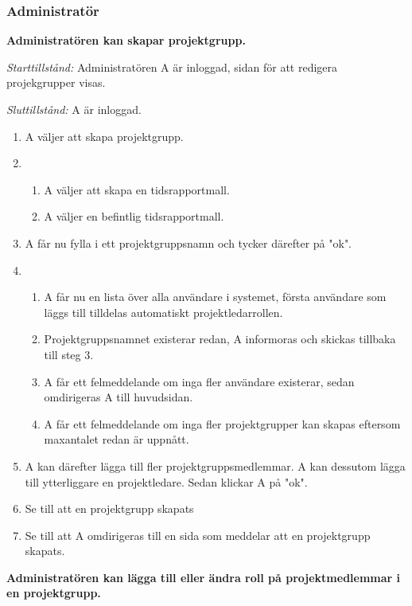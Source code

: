 \documentclass[a4paper]{article}
\begin{document}
\subsubsection{Administratör}

\begin{ST}

\item
\textbf{Administratören kan skapar projektgrupp.}

\emph{Starttillstånd:} Administratören A är inloggad, sidan för att redigera projekgrupper visas.

\emph{Sluttillstånd:} A är inloggad.

\begin{enumerate}
\item A väljer att skapa projektgrupp.
\item
\begin{enumerate}
\item A väljer att skapa en tidsrapportmall.
\item A väljer en befintlig tidsrapportmall.
\end{enumerate}
\item A får nu fylla i ett projektgruppsnamn och tycker därefter på "ok".
\item 
\begin{enumerate}
\item A får nu en lista över alla användare i systemet, första användare som läggs till tilldelas automatiskt projektledarrollen.
\item Projektgruppsnamnet existerar redan, A informoras och skickas tillbaka till steg 3.
\item A får ett felmeddelande om inga fler användare existerar, sedan omdirigeras A till huvudsidan.
\item A får ett felmeddelande om inga fler projektgrupper kan skapas eftersom maxantalet redan är uppnått.
\end{enumerate}
\item A kan därefter lägga till fler projektgruppsmedlemmar. A kan dessutom lägga till ytterliggare en projektledare. Sedan klickar A på "ok".
\item Se till att en projektgrupp skapats
\item Se till att A omdirigeras till en sida som meddelar att en projektgrupp skapats.
\end{enumerate}

\item
\textbf{Administratören kan lägga till eller ändra roll på projektmedlemmar i en projektgrupp.}


\end{ST}
\end{document}
